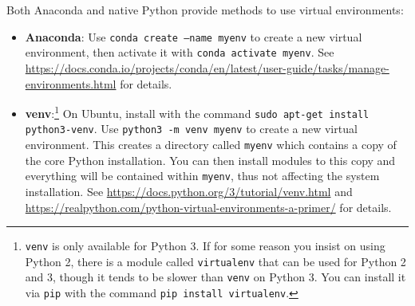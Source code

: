 \documentclass[12pt]{article}
\begin{document}
Both Anaconda and native Python provide methods to use virtual environments:
\begin{itemize}
    \item \textbf{Anaconda}: Use \texttt{conda create --name myenv} to create a new virtual environment, then activate it with \texttt{conda activate myenv}. See \url{https://docs.conda.io/projects/conda/en/latest/user-guide/tasks/manage-environments.html} for details.
    \item \textbf{venv}:\footnote{\texttt{venv} is only available for Python 3. If for some reason you insist on using Python 2, there is a module called \texttt{virtualenv} that can be used for Python 2 and 3, though it tends to be slower than \texttt{venv} on Python 3. You can install it via \texttt{pip} with the command \texttt{pip install virtualenv}.} On Ubuntu, install with the command \texttt{sudo apt-get install python3-venv}. Use \texttt{python3 -m venv myenv} to create a new virtual environment. This creates a directory called \texttt{myenv} which contains a copy of the core Python installation. You can then install modules to this copy and everything will be contained within \texttt{myenv}, thus not affecting the system installation. See \url{https://docs.python.org/3/tutorial/venv.html} and \url{https://realpython.com/python-virtual-environments-a-primer/} for details.
\end{itemize}


\printbibliography
\end{document}
